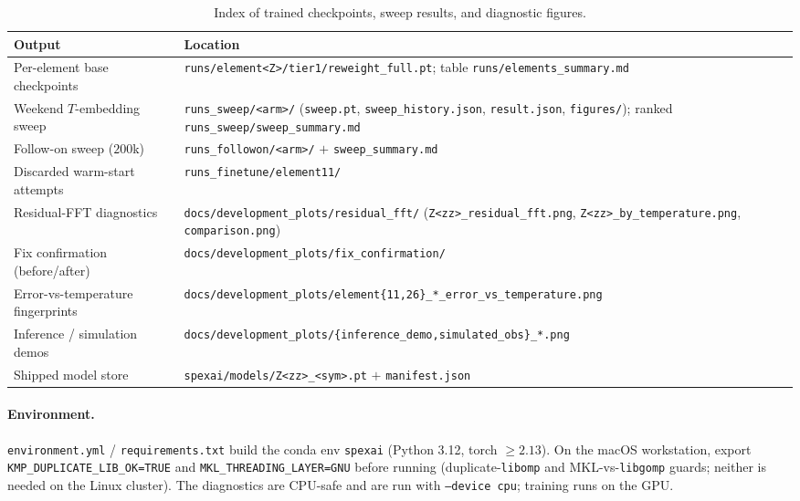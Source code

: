 \documentclass[11pt,a4paper]{article}
\newcommand{\code}[1]{\texttt{#1}}
\begin{document}
\begin{table}[ht]
\centering
\small
\begin{tabular}{p{5.4cm}p{8.4cm}}
\toprule
Output & Location\\
\midrule
Per-element base checkpoints & \code{runs/element<Z>/tier1/reweight\_full.pt};
table \code{runs/elements\_summary.md}\\
Weekend $T$-embedding sweep & \code{runs\_sweep/<arm>/} (\code{sweep.pt},
\code{sweep\_history.json}, \code{result.json}, \code{figures/}); ranked
\code{runs\_sweep/sweep\_summary.md}\\
Follow-on sweep ($200$k) & \code{runs\_followon/<arm>/} $+$
\code{sweep\_summary.md}\\
Discarded warm-start attempts & \code{runs\_finetune/element11/}\\
Residual-FFT diagnostics & \code{docs/development\_plots/residual\_fft/}
(\code{Z<zz>\_residual\_fft.png}, \code{Z<zz>\_by\_temperature.png},
\code{comparison.png})\\
Fix confirmation (before/after) &
\code{docs/development\_plots/fix\_confirmation/}\\
Error-vs-temperature fingerprints &
\code{docs/development\_plots/element\{11,26\}\_*\_error\_vs\_temperature.png}\\
Inference / simulation demos &
\code{docs/development\_plots/\{inference\_demo,simulated\_obs\}\_*.png}\\
Shipped model store & \code{spexai/models/Z<zz>\_<sym>.pt} $+$
\code{manifest.json}\\
\bottomrule
\end{tabular}
\caption{Index of trained checkpoints, sweep results, and diagnostic
figures.}
\label{tab:outputs}
\end{table}

\paragraph{Environment.} \code{environment.yml} / \code{requirements.txt}
build the conda env \code{spexai} (Python 3.12, torch $\ge2.13$). On the
macOS workstation, export \code{KMP\_DUPLICATE\_LIB\_OK=TRUE} and
\code{MKL\_THREADING\_LAYER=GNU} before running (duplicate-\code{libomp}
and MKL-vs-\code{libgomp} guards; neither is needed on the Linux
cluster). The diagnostics are CPU-safe and are run with \code{--device
cpu}; training runs on the GPU.
\end{document}
